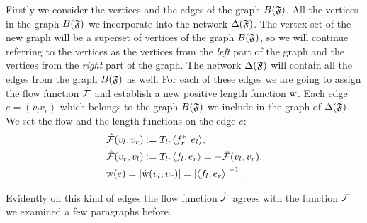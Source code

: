 \documentclass[12pt]{article}
\begin{document}
    Firstly we consider the vertices and the edges of the graph $B(\mathfrak{F})$.
    All the vertices in the graph $B(\mathfrak{F})$ we incorporate into the network $\Delta(\mathfrak{F})$.
    The vertex set of the new graph will be a superset of vertices of the graph $B(\mathfrak{F})$,
    so we will continue referring to the vertices as the vertices from
    the \emph{left} part of the graph and the vertices from the \emph{right} part of the graph.
    The network $\Delta(\mathfrak{F})$ will contain all the edges from the graph $B(\mathfrak{F})$ as well.
    For each of these edges we are going to assign the flow function $\mathcal{\hat{F}}$ and
    establish a new positive length function $\mathrm{w}$.
    Each edge $e = (v_l v_r)$ which belongs to the graph $B(\mathfrak{F})$ we include in the graph of $\Delta(\mathfrak{F})$.
    We set the flow and the length functions on the edge $e$:
    \begin{align*}
      &\mathcal{\hat{F}}(v_l, v_r) := T_{lr} \langle f^*_r, e_l \rangle,\\
      &\mathcal{\hat{F}}(v_r, v_l) := T_{lr} \langle f_l, e_r \rangle = -\mathcal{\hat{F}}(v_l, v_r),\\
      &\mathrm{w}(e) = \left| \mathrm{\hat{w}}(v_l, v_r) \right| =  \left|\langle f_l, e_r \rangle\right|^{-1}.
    \end{align*}
    \begin{note}
      Evidently on this kind of edges the flow function $\mathcal{\hat{F}}$ agrees with the function $\mathcal{\tilde{F}}$
        we examined a few paragraphs before.
    \end{note}
\end{document}
